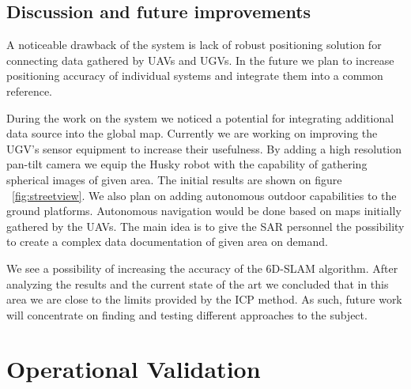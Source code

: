 \documentclass{article}
\begin{document}
\afterpage{\clearpage}

\subsection{Discussion and future improvements}


	A noticeable drawback of the system is lack of robust positioning solution for connecting data gathered by UAVs and UGVs. In the future we plan to increase positioning accuracy of individual systems and integrate them into a common reference.
	
	
	During the work on the system we noticed a potential for integrating additional data source into the global map.
Currently we are working on improving the UGV's sensor equipment to increase their usefulness.
By adding a high resolution pan-tilt camera we equip the Husky robot with the capability of gathering spherical images of given area.
The initial results are shown on figure ~\ref{fig:streetview}.
We also plan on adding autonomous outdoor capabilities to the ground platforms.
Autonomous navigation would be done based on maps initially gathered by the UAVs.
The main idea is to give the SAR personnel the possibility to create a complex data documentation of given area on demand.
	
	
	We see a possibility of increasing the accuracy of the 6D-SLAM algorithm.
	After analyzing the results and the current state of the art we concluded that in this area we are close to the limits provided by the ICP method.
	As such, future work will concentrate on finding and testing different approaches to the subject.

\section{Operational Validation}
\end{document}
